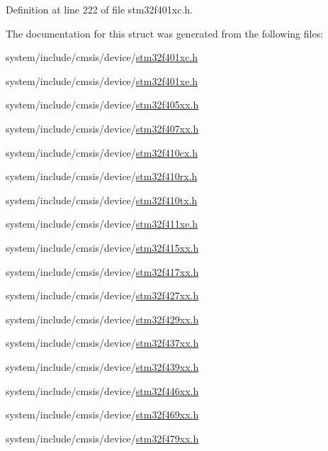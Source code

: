 Definition at line 222 of file stm32f401xc.\+h.



The documentation for this struct was generated from the following files\+:\begin{DoxyCompactItemize}
\item 
system/include/cmsis/device/\hyperlink{stm32f401xc_8h}{stm32f401xc.\+h}\item 
system/include/cmsis/device/\hyperlink{stm32f401xe_8h}{stm32f401xe.\+h}\item 
system/include/cmsis/device/\hyperlink{stm32f405xx_8h}{stm32f405xx.\+h}\item 
system/include/cmsis/device/\hyperlink{stm32f407xx_8h}{stm32f407xx.\+h}\item 
system/include/cmsis/device/\hyperlink{stm32f410cx_8h}{stm32f410cx.\+h}\item 
system/include/cmsis/device/\hyperlink{stm32f410rx_8h}{stm32f410rx.\+h}\item 
system/include/cmsis/device/\hyperlink{stm32f410tx_8h}{stm32f410tx.\+h}\item 
system/include/cmsis/device/\hyperlink{stm32f411xe_8h}{stm32f411xe.\+h}\item 
system/include/cmsis/device/\hyperlink{stm32f415xx_8h}{stm32f415xx.\+h}\item 
system/include/cmsis/device/\hyperlink{stm32f417xx_8h}{stm32f417xx.\+h}\item 
system/include/cmsis/device/\hyperlink{stm32f427xx_8h}{stm32f427xx.\+h}\item 
system/include/cmsis/device/\hyperlink{stm32f429xx_8h}{stm32f429xx.\+h}\item 
system/include/cmsis/device/\hyperlink{stm32f437xx_8h}{stm32f437xx.\+h}\item 
system/include/cmsis/device/\hyperlink{stm32f439xx_8h}{stm32f439xx.\+h}\item 
system/include/cmsis/device/\hyperlink{stm32f446xx_8h}{stm32f446xx.\+h}\item 
system/include/cmsis/device/\hyperlink{stm32f469xx_8h}{stm32f469xx.\+h}\item 
system/include/cmsis/device/\hyperlink{stm32f479xx_8h}{stm32f479xx.\+h}\end{DoxyCompactItemize}
